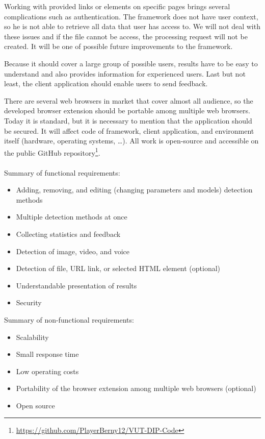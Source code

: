 Working with provided links or elements on specific pages brings several complications such as authentication. The framework does not have user context, so he is not able to retrieve all data that user has access to. We will not deal with these issues and if the file cannot be access, the processing request will not be created. It will be one of possible future improvements to the framework.

Because it should cover a large group of possible users, results have to be easy to understand and also provides information for experienced users. Last but not least, the client application should enable users to send feedback.

There are several web browsers in market that cover almost all audience, so the developed browser extension should be portable among multiple web browsers. Today it is standard, but it is necessary to mention that the application should be secured. It will affect code of framework, client application, and environment itself (hardware, operating systems, …). All work is open-source and accessible on the public GitHub repository\footnote{\url{https://github.com/PlayerBerny12/VUT-DIP-Code}}.
\\\\
\noindent Summary of functional requirements:
\begin{itemize}
    \item Adding, removing, and editing (changing parameters and models) detection methods
    \item Multiple detection methods at once
    \item Collecting statistics and feedback
    \item Detection of image, video, and voice
    \item Detection of file, URL link, or selected HTML element (optional)
    \item Understandable presentation of results
    \item Security
\end{itemize}

\noindent Summary of non-functional requirements:
\begin{itemize}
    \item Scalability
    \item Small response time
    \item Low operating costs
    \item Portability of the browser extension among multiple web browsers (optional)
    \item Open source
\end{itemize}

